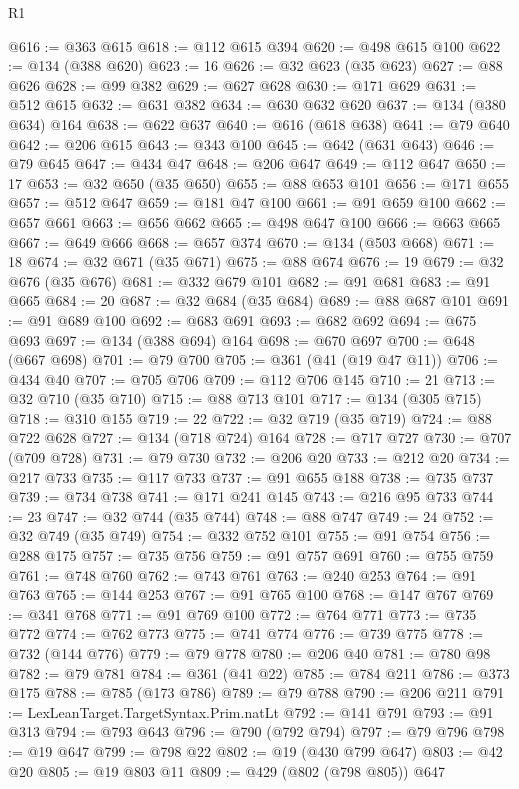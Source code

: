 \begin{lexlean}{R1}
\begin{coremodule}
{{{{{{{{{{{{{{{{{{{{{{{{{{{{{{{{{{{{{{{{{{{{{{{{{{{{{{{{{@616 := @363 @615
@618 := @112 @615 @394
@620 := @498 @615 @100
@622 := @134 (@388 @620)
@623 := 16
@626 := @32 @623 (@35 @623)
@627 := @88 @626
@628 := @99 @382
@629 := @627 @628
@630 := @171 @629
@631 := @512 @615
@632 := @631 @382
@634 := @630 @632 @620
@637 := @134 (@380 @634) @164
@638 := @622 @637
@640 := @616 (@618 @638)
@641 := @79 @640
@642 := @206 @615
@643 := @343 @100
@645 := @642 (@631 @643)
@646 := @79 @645
@647 := @434 @47
@648 := @206 @647
@649 := @112 @647
@650 := 17
@653 := @32 @650 (@35 @650)
@655 := @88 @653 @101
@656 := @171 @655
@657 := @512 @647
@659 := @181 @47 @100
@661 := @91 @659 @100
@662 := @657 @661
@663 := @656 @662
@665 := @498 @647 @100
@666 := @663 @665
@667 := @649 @666
@668 := @657 @374
@670 := @134 (@503 @668)
@671 := 18
@674 := @32 @671 (@35 @671)
@675 := @88 @674
@676 := 19
@679 := @32 @676 (@35 @676)
@681 := @332 @679 @101
@682 := @91 @681
@683 := @91 @665
@684 := 20
@687 := @32 @684 (@35 @684)
@689 := @88 @687 @101
@691 := @91 @689 @100
@692 := @683 @691
@693 := @682 @692
@694 := @675 @693
@697 := @134 (@388 @694) @164
@698 := @670 @697
@700 := @648 (@667 @698)
@701 := @79 @700
@705 := @361 (@41 (@19 @47 @11))
@706 := @434 @40
@707 := @705 @706
@709 := @112 @706 @145
@710 := 21
@713 := @32 @710 (@35 @710)
@715 := @88 @713 @101
@717 := @134 (@305 @715)
@718 := @310 @155
@719 := 22
@722 := @32 @719 (@35 @719)
@724 := @88 @722 @628
@727 := @134 (@718 @724) @164
@728 := @717 @727
@730 := @707 (@709 @728)
@731 := @79 @730
@732 := @206 @20
@733 := @212 @20
@734 := @217 @733
@735 := @117 @733
@737 := @91 @655 @188
@738 := @735 @737
@739 := @734 @738
@741 := @171 @241 @145
@743 := @216 @95 @733
@744 := 23
@747 := @32 @744 (@35 @744)
@748 := @88 @747
@749 := 24
@752 := @32 @749 (@35 @749)
@754 := @332 @752 @101
@755 := @91 @754
@756 := @288 @175
@757 := @735 @756
@759 := @91 @757 @691
@760 := @755 @759
@761 := @748 @760
@762 := @743 @761
@763 := @240 @253
@764 := @91 @763
@765 := @144 @253
@767 := @91 @765 @100
@768 := @147 @767
@769 := @341 @768
@771 := @91 @769 @100
@772 := @764 @771
@773 := @735 @772
@774 := @762 @773
@775 := @741 @774
@776 := @739 @775
@778 := @732 (@144 @776)
@779 := @79 @778
@780 := @206 @40
@781 := @780 @98
@782 := @79 @781
@784 := @361 (@41 @22)
@785 := @784 @211
@786 := @373 @175
@788 := @785 (@173 @786)
@789 := @79 @788
@790 := @206 @211
@791 := LexLeanTarget.TargetSyntax.Prim.natLt
@792 := @141 @791
@793 := @91 @313
@794 := @793 @643
@796 := @790 (@792 @794)
@797 := @79 @796
@798 := @19 @647
@799 := @798 @22
@802 := @19 (@430 @799 @647)
@803 := @42 @20
@805 := @19 @803 @11
@809 := @429 (@802 (@798 @805)) @647
}}}}}}}}}}}}}}}}}}}}}}}}}}}}}}}}}}}}}}}}}}}}}}}}}}}}}}}}}
\end{coremodule}
\end{lexlean}
